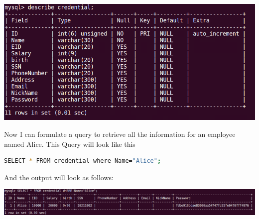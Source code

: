 \documentclass[14pt]{extarticle}
\begin{document}
\begin{center}
\includegraphics[width=\linewidth]{describe-credential}\\
\end{center}
Now I can formulate a query to retrieve all the information for an employee named Alice. This Query will look like this
\begin{lstlisting}[language=sh]
SELECT * FROM credential where Name="Alice";
\end{lstlisting}
And the output will look as follows:\\
\begin{center}
\includegraphics[width=\linewidth]{select-alice-credential}\\
\end{center}
\end{document}

